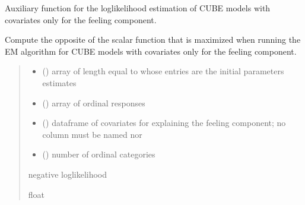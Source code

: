 \documentclass[letterpaper,10pt,english]{sphinxmanual}
\begin{document}
\begin{fulllineitems}
\label{\detokenize{cubmods:cubmods.cube_0w0.effe}}
\pysigstartsignatures
{}
\pysigstopsignatures
\sphinxAtStartPar
Auxiliary function for the log\sphinxhyphen{}likelihood estimation of CUBE models with covariates 
only for the feeling component.

\sphinxAtStartPar
Compute the opposite of the scalar function that is maximized when running the 
E\sphinxhyphen{}M algorithm for CUBE models with covariates only for the feeling component.
\begin{quote}\begin{description}
\begin{itemize}
\item {} 
\sphinxAtStartPar
{} () \textendash{} array of length equal to  whose entries are the initial parameters estimates

\item {} 
\sphinxAtStartPar
{} () \textendash{} array of ordinal responses

\item {} 
\sphinxAtStartPar
{} () \textendash{} dataframe of covariates for explaining the feeling component;
no column must be named  nor 

\item {} 
\sphinxAtStartPar
{} () \textendash{} number of ordinal categories

\end{itemize}

\sphinxAtStartPar
negative log\sphinxhyphen{}likelihood

\sphinxAtStartPar
float

\end{description}\end{quote}

\end{fulllineitems}
\end{document}
